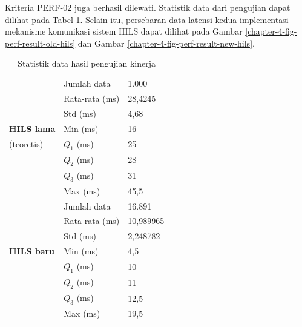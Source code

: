 Kriteria PERF-02 juga berhasil dilewati. Statistik data dari pengujian dapat
dilihat pada Tabel \ref{chapter-4-tbl-perf-result-statistics}. Selain itu,
persebaran data latensi kedua implementasi mekanisme komunikasi sistem HILS
dapat dilihat pada Gambar \ref{chapter-4-fig-perf-result-old-hils} dan Gambar
\ref{chapter-4-fig-perf-result-new-hils}.
\begin{table}[!htbp]
	\begin{center}
		\begin{tabular}{|l|l|l|}
			\hline
			                   & Jumlah data    & 1.000     \\
			\cline{2-3}
			                   & Rata-rata (ms) & 28,4245   \\
			\cline{2-3}
			                   & Std (ms)       & 4,68      \\
			\cline{2-3}
			\textbf{HILS lama} & Min (ms)       & 16        \\
			\cline{2-3}
			(teoretis)         & $Q_1$ (ms)     & 25        \\
			\cline{2-3}
			                   & $Q_2$ (ms)     & 28        \\
			\cline{2-3}
			                   & $Q_3$ (ms)     & 31        \\
			\cline{2-3}
			                   & Max (ms)       & 45,5      \\
			\cline{2-3}
			\hline

			\hline
			                   & Jumlah data    & 16.891    \\
			\cline{2-3}
			                   & Rata-rata (ms) & 10,989965 \\
			\cline{2-3}
			                   & Std (ms)       & 2,248782  \\
			\cline{2-3}
			\textbf{HILS baru} & Min (ms)       & 4,5       \\
			\cline{2-3}
			                   & $Q_1$ (ms)     & 10        \\
			\cline{2-3}
			                   & $Q_2$ (ms)     & 11        \\
			\cline{2-3}
			                   & $Q_3$ (ms)     & 12,5      \\
			\cline{2-3}
			                   & Max (ms)       & 19,5      \\
			\cline{2-3}
			\hline
		\end{tabular}
	\end{center}

	\caption{Statistik data hasil pengujian kinerja}
	\label{chapter-4-tbl-perf-result-statistics}
\end{table}
